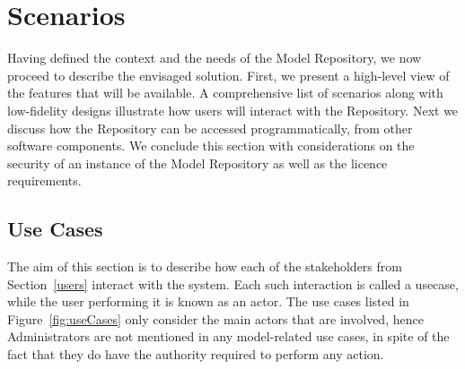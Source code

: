 \section{Scenarios}
\label{scenarios}
Having defined the context and the needs of the \ddmore Model Repository, we now proceed to describe the envisaged solution. First, we present a high-level view of the features that will be available. A comprehensive list of scenarios along with low-fidelity designs illustrate how users will interact with the Repository. Next we discuss how the Repository can be accessed programmatically, from other software components. We conclude this section with considerations on the security of an instance of the \ddmore Model Repository as well as the licence requirements. 

\subsection{Use Cases}
\label{useCases}
The aim of this section is to describe how each of the stakeholders from Section~\ref{users} interact with the system. Each such interaction is called a \gls{usecase}, while the user performing it is known as an \gls{actor}. The use cases listed in Figure~\ref{fig:useCases} only consider the main actors that are involved, hence Administrators are not mentioned in any model-related use cases, in spite of the fact that they do have the authority required to perform any action. 

